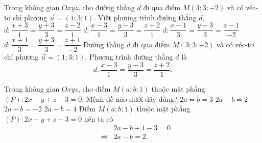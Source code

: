\begin{ex}%
	Trong không gian $Oxyz$, cho đường thẳng $d$ đi qua điểm $M(3;3;-2)$ và có véc-tơ chỉ phương $\vec{u}=(1;3;1)$. Viết phương trình đường thẳng $d$.
	\choice
	{$d\colon\dfrac{x+3}{1}=\dfrac{y+3}{3}=\dfrac{z-2}{1}$}
	{\True $d\colon\dfrac{x-3}{1}=\dfrac{y-3}{3}=\dfrac{z+2}{1}$}
	{$d\colon\dfrac{x-1}{3}=\dfrac{y-3}{3}=\dfrac{z-1}{-2}$}
	{$d\colon\dfrac{x+1}{3}=\dfrac{y+3}{3}=\dfrac{z+1}{-2}$}
	\loigiai
	{
		Đường thẳng $d$ đi qua điểm $M(3;3;-2)$ và có véc-tơ chỉ phương $\vec{u}=(1;3;1)$. Phương trình đường thẳng $d$ là $$d\colon\dfrac{x-3}{1}=\dfrac{y-3}{3}=\dfrac{z+2}{1}.$$
	}
\end{ex}

\begin{ex}%
	Trong không gian $Oxyz$, cho điểm $M(a;b;1)$ thuộc mặt phẳng $(P)\colon 2x-y+z-3=0$. Mệnh đề nào dưới đây đúng?
	\choice
	{$2a=b=3$}
	{\True $2a-b=2$}
	{$2a-b=-2$}
	{$2a-b=4$}
	\loigiai
	{
		Điểm $M(a;b;1)$ thuộc mặt phẳng $(P)\colon 2x-y+z-3=0$ nên ta có
		\begin{eqnarray*}
			& & 2a-b+1-3=0\\
			& \Leftrightarrow & 2a-b=2.
		\end{eqnarray*}
	\vspace{-3ex}
	}
\end{ex}

